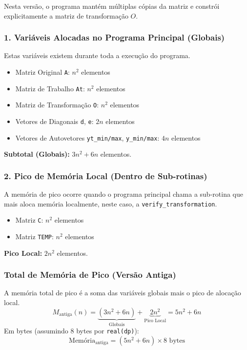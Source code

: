 \documentclass[12pt, a4paper]{article} %
\begin{document}
            Nesta vers\~ao, o programa mant\'em m\'ultiplas c\'opias da matriz e constr\'oi explicitamente a matriz de transforma\c{c}\~ao $O$.

            \subsubsection*{1. Vari\'aveis Alocadas no Programa Principal (Globais)}
            Estas vari\'aveis existem durante toda a execu\c{c}\~ao do programa.
            \begin{itemize}
                \item Matriz Original \texttt{A}: $n^2$ elementos
                \item Matriz de Trabalho \texttt{At}: $n^2$ elementos
                \item Matriz de Transforma\c{c}\~ao \texttt{O}: $n^2$ elementos
                \item Vetores de Diagonais \texttt{d}, \texttt{e}: $2n$ elementos
                \item Vetores de Autovetores \texttt{yt\_min/max}, \texttt{y\_min/max}: $4n$ elementos
            \end{itemize}
            \textbf{Subtotal (Globais):} $3n^2 + 6n$ elementos.

            \subsubsection*{2. Pico de Mem\'oria Local (Dentro de Sub-rotinas)}
            A mem\'oria de pico ocorre quando o programa principal chama a sub-rotina que mais aloca mem\'oria localmente, neste caso, a \texttt{verify\_transformation}.
            \begin{itemize}
                \item Matriz \texttt{C}: $n^2$ elementos
                \item Matriz \texttt{TEMP}: $n^2$ elementos
            \end{itemize}
            \textbf{Pico Local:} $2n^2$ elementos.

            \subsubsection*{Total de Mem\'oria de Pico (Vers\~ao Antiga)}
            A mem\'oria total de pico \'e a soma das vari\'aveis globais mais o pico de aloca\c{c}\~ao local.
            \[
            M_{\text{antiga}}(n) = \underbrace{(3n^2 + 6n)}_{\text{Globais}} + \underbrace{2n^2}_{\text{Pico Local}} = 5n^2 + 6n
            \]
            Em bytes (assumindo 8 bytes por \texttt{real(dp)}):
            \[
            \text{Mem\'oria}_{\text{antiga}} = (5n^2 + 6n) \times 8 \text{ bytes}
            \]
\end{document}
